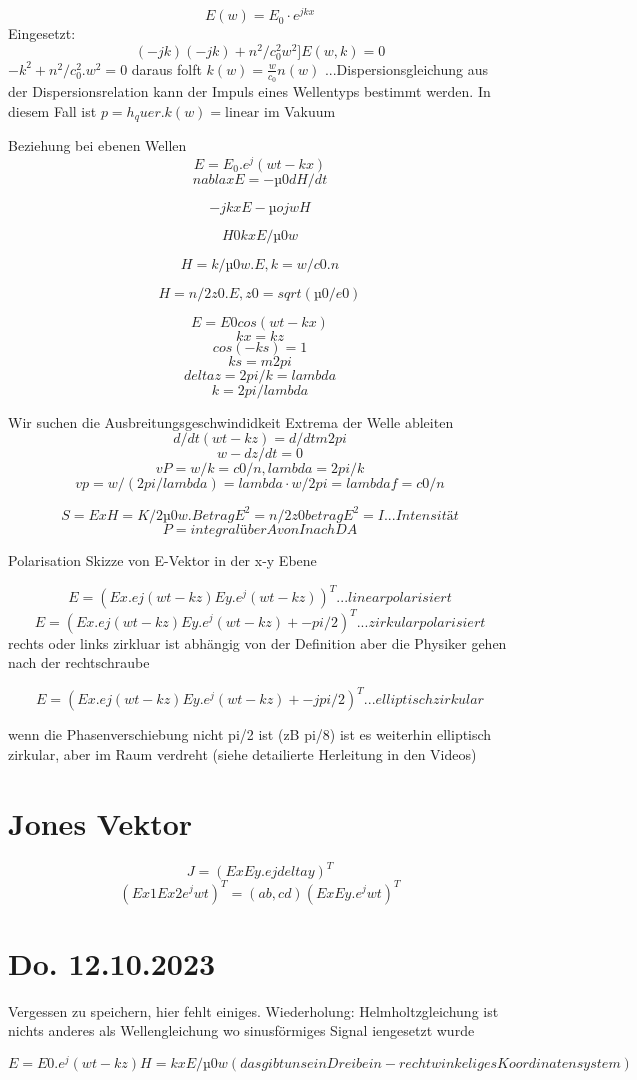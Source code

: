 \documentclass[a4paper]{article}
\begin{document}
\[ E(w)=E_0\cdot e^{jkx} \]
Eingesetzt:
\[ (-jk)(-jk)+n^2/c_0^2w^2]E(w,k)=0 \]
$-k^2+n^2/c_0^2.w^2=0 $ daraus folft $k(w)=\frac{w}{c_0}n(w) $ ...Dispersionsgleichung
aus der Dispersionsrelation kann der Impuls eines Wellentyps bestimmt werden. In diesem Fall ist $p=h_quer.k(w)=\text{linear}$ im Vakuum

Beziehung bei ebenen Wellen
\[ E=E_0.e^j(wt-kx) \]
\[ nablaxE=-µ0dH/dt \]

\[ -jkxE-µojwH \]

\[ H0kxE/µ0w \]


\[H=k/µ0w.E, k=w/c0.n\]

\[H=n/2z0.E, z0=sqrt(µ0/e0)\]

\[E=E0cos(wt-kx)\]
\[kx=kz\]
\[cos(-ks)=1\]
\[ks=m2pi\]
\[deltaz=2pi/k=lambda\]
\[k=2pi/lambda\]

Wir suchen die Ausbreitungsgeschwindidkeit
Extrema der Welle ableiten
\[d/dt(wt-kz)=d/dtm2pi\]
\[w-dz/dt=0\]
\[vP=w/k=c0/n, lambda =2pi/k\]
\[vp =w/(2pi/lambda)=lambda\cdot w/2pi=lambdaf=c0/n\]

\[S=ExH=K/2µ0w.BetragE ^2=n/2z0betragE^2=I ... Intensität\]
\[P=integral über A von I nach DA\]

Polarisation
Skizze von E-Vektor in der  x-y Ebene

\[E=(Ex.ej(wt-kz) Ey.e^j(wt-kz))^T ...linear polarisiert\]
\[E=(Ex.ej(wt-kz) Ey.e^j(wt-kz)+-pi/2)^T ...zirkular polarisiert\]
rechts oder links zirkluar ist abhängig von der Definition aber die Physiker gehen nach der rechtschraube

\[E=(Ex.ej(wt-kz) Ey.e^j(wt-kz)+-jpi/2)^T   ...elliptisch zirkular\]

wenn die Phasenverschiebung nicht pi/2 ist (zB pi/8) ist es weiterhin elliptisch zirkular, aber im Raum verdreht (siehe detailierte Herleitung in den Videos)

\section*{Jones Vektor} 
\[J = ( Ex Ey.ejdeltay)^T\]
\[(Ex1 Ex2 e^jwt)^T=(a b ,c d)(Ex Ey.e^jwt)^T\]

\section*{Do. 12.10.2023}
 Vergessen zu speichern, hier fehlt einiges.
Wiederholung: Helmholtzgleichung ist nichts anderes als Wellengleichung wo sinusförmiges Signal iengesetzt wurde

\[E=E0.e^j(wt-kz) H=kxE/µ0w (das gibt uns ein Dreibein - rechtwinkeliges Koordinatensystem)\]
\end{document}
